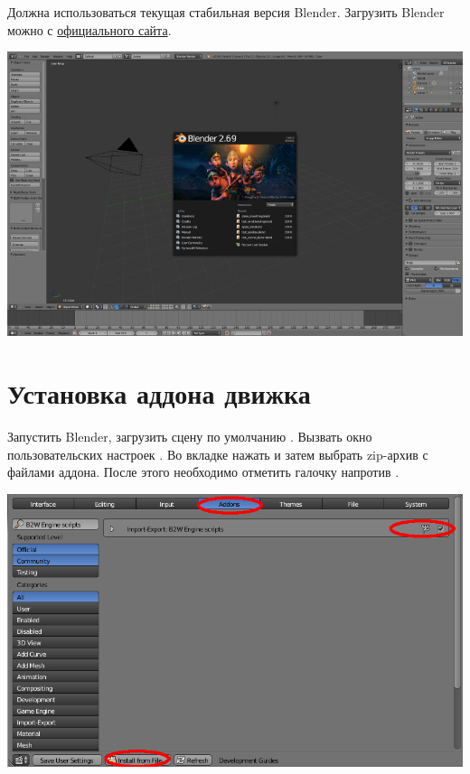 \documentclass[a4paper,12pt,oneside]{sphinxmanual}
\begin{document}
Должна использоваться текущая стабильная версия Blender. Загрузить Blender можно с \href{http://www.blender.org/download}{официального сайта}.

{\hfill\includegraphics[width=1.000\linewidth]{blender_first_run.jpg}\hfill}


\section{Установка аддона движка}
\label{first_steps:index-0}\label{first_steps:id4}\label{first_steps:first-step-addon}
Запустить Blender, загрузить сцену по умолчанию .
Вызвать окно пользовательских настроек . Во вкладке  нажать  и затем выбрать zip-архив с файлами аддона. После этого необходимо отметить галочку напротив .

{\hfill\includegraphics[width=1.000\linewidth]{user_preferences_install_b2w.jpg}\hfill}
\end{document}
